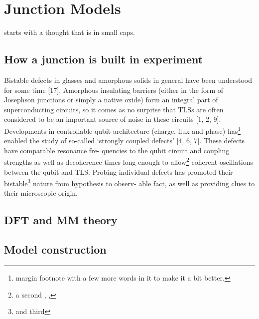 \chapter{Junction Models}

 starts with a thought that is in small caps.

\section{How a junction is built in experiment}
Bistable defects  in glasses and amorphous solids in general have been understood for some time [17].
Amorphous insulating barriers (either in the form of Josephson junctions or simply a native oxide) form an integral part of superconducting circuits, so it comes as no surprise that TLSs are often considered to be an important source of noise in these circuits [1, 2, 9]. Developments in controllable
qubit architecture (charge, flux and phase) has\footnote{margin footnote with a few more words in it to make it a bit better.} enabled the study of so-called
‘strongly coupled defects’ [4, 6, 7]. These defects have comparable resonance fre-
quencies to the qubit circuit and coupling strengths as well as decoherence times
long enough to allow\footnote{a second \the\marginparwidth, \the\marginparsep, \the\marginparpush} coherent oscillations between the qubit and TLS. Probing
individual defects has promoted their bistable\footnote{and third} nature from hypothesis to observ-
able fact, as well as providing clues to their microscopic origin.

\section{DFT and MM theory}
\section{Model construction}
